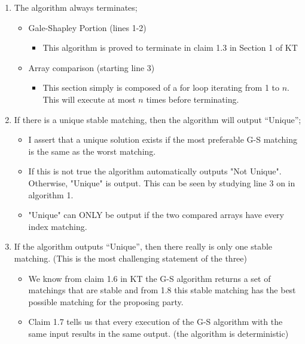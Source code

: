 \documentclass[11pt]{article}
\begin{document}
\begin{enumerate}
\begin{enumerate}
    \begin{enumerate}
        \color{black}
        \item The algorithm always terminates;
        \color{teal}
            \begin{itemize}
                \item Gale-Shapley Portion (lines 1-2)
                    \begin{itemize}
                        \item This algorithm is proved to terminate in claim 1.3 in Section 1 of KT
                    \end{itemize}
                \item Array comparison (starting line 3)
                    \begin{itemize}
                        \item This section simply is composed of a for loop iterating from 1 to $n$. This will execute at most $n$ times before terminating.
                    \end{itemize}
            \end{itemize}
        \color{black}
        \item If there is a unique stable matching, then the algorithm will output ``Unique'';
        \color{teal}
            \begin{itemize}
                \item I assert that a unique solution exists if the most preferable G-S matching is the same as the worst matching.
                \item If this is not true the algorithm automatically outputs "Not Unique". Otherwise, "Unique" is output. This can be seen by studying line 3 on in algorithm 1.
                \item "Unique" can ONLY be output if the two compared arrays have every index matching.
            \end{itemize}
        \color{black}
        \item If the algorithm outputs ``Unique'', then there really is only one stable matching. (This is the most challenging statement of the three)
        \color{teal}
            \begin{itemize}
                \item We know from claim 1.6 in KT the G-S algorithm returns a set of matchings that are stable and from 1.8 this stable matching has the best possible matching for the proposing party. 
                \item Claim 1.7 tells us that every execution of the G-S algorithm with the same input results in the same output. (the algorithm is deterministic)

\end{itemize}
\end{enumerate}
\end{enumerate}
\end{enumerate}
\end{document}
